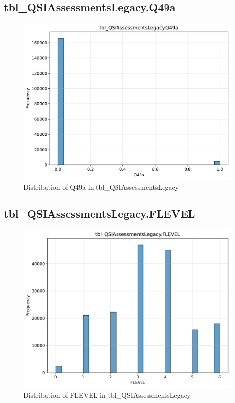 \subsection{tbl\_QSIAssessmentsLegacy.Q49a}

\begin{figure}[htbp]
\centering
\includegraphics[width=\textwidth]{figures/dbo_tbl_QSIAssessmentsLegacy_Q49a.pdf}
\caption{Distribution of Q49a in tbl\_QSIAssessmentsLegacy}
\end{figure}\newpage

\subsection{tbl\_QSIAssessmentsLegacy.FLEVEL}

\begin{figure}[htbp]
\centering
\includegraphics[width=\textwidth]{figures/dbo_tbl_QSIAssessmentsLegacy_FLEVEL.pdf}
\caption{Distribution of FLEVEL in tbl\_QSIAssessmentsLegacy}
\end{figure}\newpage

